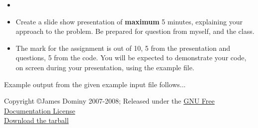 \begin{enumerate}
\begin{itemize}
	\item 
	\item Create a slide show presentation of \textbf{maximum} 5 minutes, explaining your approach to the problem. Be prepared for question from myself, and the class.
	\item The mark for the assignment is out of 10, 5 from the presentation and questions, 5 from the code. You will be expected to demonstrate your code, on screen during your presentation, using the example file.
\end{itemize}     Example output from the given example input file follows...    
\end{enumerate}   Copyright \copyright James Dominy 2007-2008; Released under the \href{http://www.gnu.org/copyleft/fdl.html}{GNU Free Documentation License}
\\\href{intropython.tar.gz}{Download the tarball}

